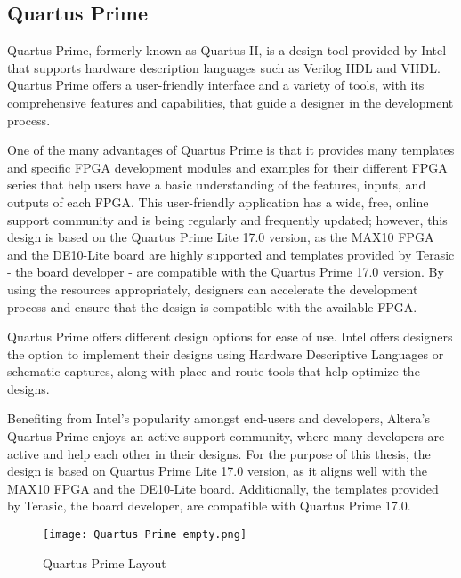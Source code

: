 \subsection{Quartus Prime}
\par Quartus Prime, formerly known as Quartus II, is a design tool provided by Intel that supports hardware description languages such as Verilog HDL and VHDL. Quartus Prime offers a user-friendly interface and a variety of tools, with its comprehensive features and capabilities, that guide a designer in the development process. \newline 
\par One of the many advantages of Quartus Prime is that it provides many templates and specific FPGA development modules and examples for their different FPGA series that help users have a basic understanding of the features, inputs, and outputs of each FPGA. This user-friendly application has a wide, free, online support community and is being regularly and frequently updated; however, this design is based on the Quartus Prime Lite 17.0 version, as the MAX10 FPGA and the DE10-Lite board are highly supported and templates provided by Terasic - the board developer - are compatible with the Quartus Prime 17.0 version. By using the resources appropriately, designers can accelerate the development process and ensure that the design is compatible with the available FPGA. \newline
\par Quartus Prime offers different design options for ease of use. Intel offers designers the option to implement their designs using Hardware Descriptive Languages or schematic captures, along with place and route tools that help optimize the designs. \newline
\par Benefiting from Intel's popularity amongst end-users and developers, Altera's Quartus Prime enjoys an active support community, where many developers are active and help each other in their designs. For the purpose of this thesis, the design is based on Quartus Prime Lite 17.0 version, as it aligns well with the MAX10 FPGA and the DE10-Lite board. Additionally, the templates provided by Terasic, the board developer, are compatible with Quartus Prime 17.0. \newline
\begin{figure}[H]
    \centering
    \texttt{[image: Quartus Prime empty.png]}
    \caption{Quartus Prime Layout}
    \label{fig:EmptyQuartusPrime}  
\end{figure}

